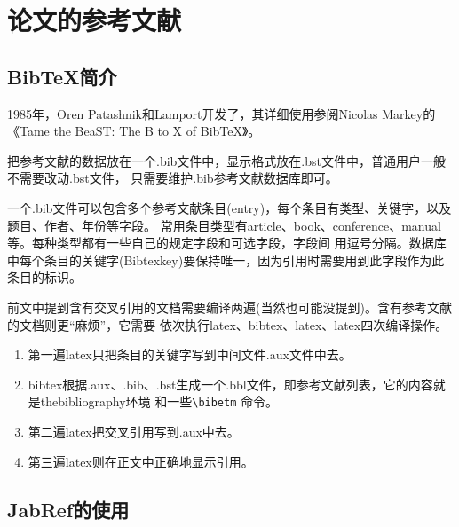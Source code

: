 \chapter{论文的参考文献}
\section{BibTeX简介}
1985年，Oren Patashnik和Lamport开发了\bibtex{}，其详细使用参阅Nicolas Markey的
《Tame the BeaST: The B to X of BibTeX》。

\bibtex{}把参考文献的数据放在一个.bib文件中，显示格式放在.bst文件中，普通用户一般不需要改动.bst文件，
只需要维护.bib参考文献数据库即可。

一个.bib文件可以包含多个参考文献条目(entry)，每个条目有类型、关键字，以及题目、作者、年份等字段。
常用条目类型有article、book、conference、manual等。每种类型都有一些自己的规定字段和可选字段，字段间
用逗号分隔。数据库中每个条目的关键字(Bibtexkey)要保持唯一，因为引用时需要用到此字段作为此条目的标识。

前文中提到含有交叉引用的文档需要编译两遍(当然也可能没提到)。含有参考文献的文档则更“麻烦”，它需要
依次执行latex、bibtex、latex、latex四次编译操作。
\begin{enumerate}
\item 第一遍latex只把条目的关键字写到中间文件.aux文件中去。
\item bibtex根据.aux、.bib、.bst生成一个.bbl文件，即参考文献列表，它的内容就是thebibliography环境
和一些\verb|\bibetm| 命令。
\item 第二遍latex把交叉引用写到.aux中去。
\item 第三遍latex则在正文中正确地显示引用。
\end{enumerate}
\section{JabRef的使用}
